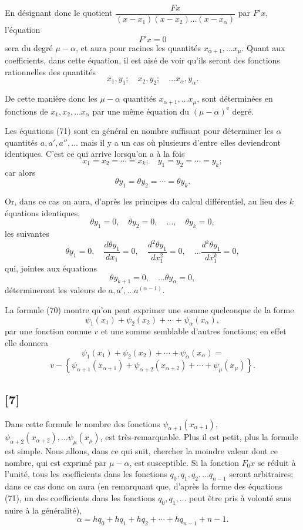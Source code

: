 \documentclass{article}
\begin{document}
En désignant donc le quotient $\dfrac{F x}{(x-x_1)(x-x_2) \ldots (x-x_\alpha)}$ par $F' x$, l'équation
\[ F' x = 0 \tag{72} \]
sera du degré $\mu-\alpha$, et aura pour racines les quantités $x_{\alpha+1}, \ldots x_\mu$. Quant aux coefficients, dans cette équation, il est aisé de voir qu'ils seront des fonctions rationnelles des quantités
\[ x_1, y_1; \quad x_2, y_2; \quad \ldots x_\alpha, y_\alpha. \]

De cette manière donc les $\mu-\alpha$ quantités $x_{\alpha+1}, \ldots x_\mu$, sont déterminées en fonctions de $x_1, x_2, \ldots x_\alpha$ par une même équation du $(\mu-\alpha)^{\text{e}}$ degré.

Les équations (71) sont en général en nombre suffisant pour déterminer les $\alpha$ quantités $a, a', a'', \ldots$ mais il y a un cas où plusieurs d'entre elles deviendront identiques. C'est ce qui arrive lorsqu'on a à la fois
\[ x_1 = x_2 = \cdots = x_k; \quad y_1 = y_2 = \cdots = y_k; \]
car alors
\[ \theta y_1 = \theta y_2 = \cdots = \theta y_k. \]

Or, dans ce cas on aura, d'après les principes du calcul différentiel, au lieu des $k$ équations identiques,
\[ \theta y_1 = 0, \quad \theta y_2 = 0, \quad \ldots, \quad \theta y_k = 0, \]
les suivantes
\[ \theta y_1 = 0, \quad \frac{d\theta y_1}{dx_1} = 0, \quad \frac{d^{2}\theta y_1}{dx_1^{2}} = 0, \quad \ldots \frac{d^{k}\theta y_1}{dx_1^{k}} = 0, \tag{73} \]
qui, jointes aux équations
\[ \theta y_{k+1} = 0, \quad \ldots \theta y_\alpha = 0, \]
détermineront les valeurs de $a, a', \ldots a^{(\alpha-1)}$.

La formule (70) montre qu'on peut exprimer une somme quelconque de la forme
\[ \psi_1(x_1) + \psi_2(x_2) + \cdots + \psi_\alpha(x_\alpha), \]
par une fonction connue $v$ et une somme semblable d'autres fonctions; en effet elle donnera
\[ \psi_1(x_1) + \psi_2(x_2) + \cdots + \psi_\alpha(x_\alpha) = \]
\[ v - \left\{ \psi_{\alpha+1}(x_{\alpha+1}) + \psi_{\alpha+2}(x_{\alpha+2}) + \cdots + \psi_\mu(x_\mu) \right\}. \tag{74} \]

\subsection*{[7]}

Dans cette formule le nombre des fonctions $\psi_{\alpha+1}(x_{\alpha+1})$, $\psi_{\alpha+2}(x_{\alpha+2}), \ldots \psi_\mu(x_\mu)$, est très-remarquable. Plus il est petit, plus la formule est simple. Nous allons, dans ce qui suit, chercher la moindre valeur dont ce nombre, qui est exprimé par $\mu-\alpha$, est susceptible.
Si la fonction $F_0 x$ se réduit à l'unité, tous les coefficients dans les fonctions $q_0, q_1, q_2, \ldots q_{n-1}$ seront arbitraires; dans ce cas donc on aura (en remarquant que, d'après la forme des équations (71), un des coefficients dans les fonctions $q_0, q_1, \ldots$ peut être pris à volonté sans nuire à la généralité),
\[ \alpha = hq_0 + hq_1 + hq_2 + \cdots + hq_{n-1} + n - 1. \]
\end{document}
